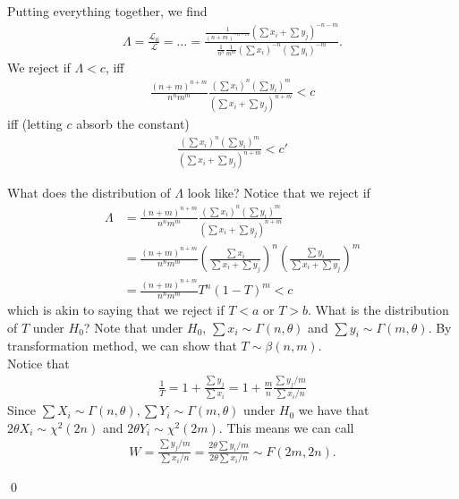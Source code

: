 \documentclass{book}
\theoremstyle{definition}
\newcommand{\lag}{\mathcal{L}}
\newcommand{\f}[2]{\frac{#1}{#2}}
\newcommand{\lp}{\left(}
\newcommand{\rp}{\right)}
\begin{document}
Putting everything together, we find
\begin{align}
\Lambda = \f{\lag_0}{\lag} = \dots = \f{\f{1}{(n+m)^{-n-m}} \lp \sum x_i + \sum y_j \rp^{-n-m}   }{\f{1}{n^n} \f{1}{m^m} \lp \sum x_i \rp^{-n} \lp \sum y_i \rp^{-m}}.
\end{align}
We reject if $\Lambda < c$, iff
\begin{align}
\f{(n+m)^{n+m}}{n^n m^m} \f{\lp \sum x_i \rp^{n} \lp \sum y_i \rp^{m}}{\lp \sum x_i + \sum y_j \rp^{n+m} } < c
\end{align}
iff (letting $c$ absorb the constant)
\begin{align}
\f{\lp \sum x_i \rp^{n} \lp \sum y_i \rp^{m}}{\lp \sum x_i + \sum y_j \rp^{n+m} } < c'
\end{align}


What does the distribution of $\Lambda$ look like? Notice that we reject if
\begin{align}
\Lambda &= \f{(n+m)^{n+m}}{n^n m^m} \f{\lp \sum x_i \rp^{n} \lp \sum y_i \rp^{m}}{\lp \sum x_i + \sum y_j \rp^{n+m} }\\
&= \f{(n+m)^{n+m}}{n^n m^m}\lp \f{ \sum x_i}{ \sum x_i + \sum y_j  }  \rp^n\lp \f{ \sum y_i}{ \sum x_i + \sum y_j  }  \rp^m \\
&= \f{(n+m)^{n+m}}{n^n m^m} T^n (1-T)^{m} < c
\end{align}
which is akin to saying that we reject if $T < a$ or $T > b$. What is the distribution of $T$ under $H_0$? Note that under $H_0$, $\sum x_i \sim \Gamma(n,\theta)$ and $\sum y_i \sim \Gamma(m, \theta)$. By transformation method, we can show that $\boxed{T \sim \beta(n,m)}$. \\


Notice that 
\begin{align}
\f{1}{T} = 1 + \f{\sum y_j}{\sum x_i} =  1 + \f{m}{n}\f{\sum y_j/m}{\sum x_i/n}
\end{align}
Since $\sum X_i \sim  \Gamma(n,\theta), \sum Y_i \sim \Gamma(m,\theta)$ under $H_0$ we have that $2\theta X_i \sim \chi^2(2n)$ and $2\theta Y_i \sim \chi^2(2m)$. This means we can call
\begin{align}
\boxed{W = \f{\sum y_j/m}{\sum x_i/n} = \f{2\theta \sum y_i/m}{2\theta \sum x_i/n} \sim F(2m,2n)}. 
\end{align}

\qed


\newpage
\end{document}
